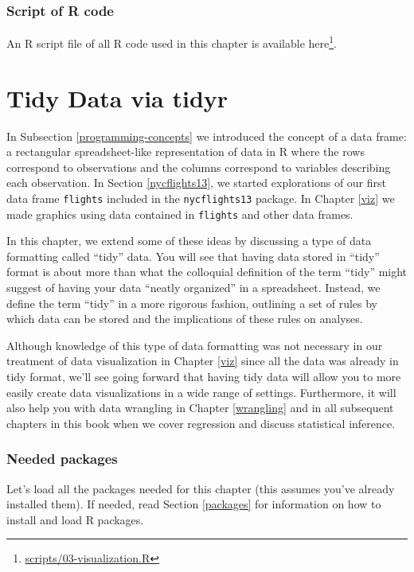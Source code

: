 \documentclass[12pt,]{krantz}
\renewcommand{\href}[2]{#2\footnote{\url{#1}}}
\begin{document}
\subsection{Script of R code}\label{script-of-r-code}

An R script file of all R code used in this chapter is available
\href{scripts/03-visualization.R}{here}.

\chapter{Tidy Data via tidyr}\label{tidy}

In Subsection \ref{programming-concepts} we introduced the concept of a
data frame: a rectangular spreadsheet-like representation of data in R
where the rows correspond to observations and the columns correspond to
variables describing each observation. In Section \ref{nycflights13}, we
started explorations of our first data frame \texttt{flights} included
in the \texttt{nycflights13} package. In Chapter \ref{viz} we made
graphics using data contained in \texttt{flights} and other data frames.

In this chapter, we extend some of these ideas by discussing a type of
data formatting called ``tidy'' data. You will see that having data
stored in ``tidy'' format is about more than what the colloquial
definition of the term ``tidy'' might suggest of having your data
``neatly organized'' in a spreadsheet. Instead, we define the term
``tidy'' in a more rigorous fashion, outlining a set of rules by which
data can be stored and the implications of these rules on analyses.

Although knowledge of this type of data formatting was not necessary in
our treatment of data visualization in Chapter \ref{viz} since all the
data was already in tidy format, we'll see going forward that having
tidy data will allow you to more easily create data visualizations in a
wide range of settings. Furthermore, it will also help you with data
wrangling in Chapter \ref{wrangling} and in all subsequent chapters in
this book when we cover regression and discuss statistical inference.

\subsection*{Needed packages}\label{needed-packages-1}


Let's load all the packages needed for this chapter (this assumes you've
already installed them). If needed, read Section \ref{packages} for
information on how to install and load R packages.
\end{document}
